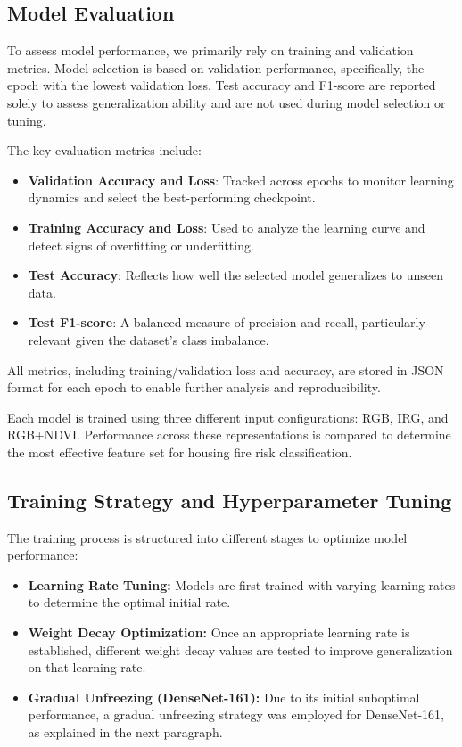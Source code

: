 \subsection{Model Evaluation}

To assess model performance, we primarily rely on training and validation metrics.
Model selection is based on validation performance, specifically, the epoch 
with the lowest validation loss. Test accuracy and F1-score are reported 
solely to assess generalization ability and are not used during model 
selection or tuning.

The key evaluation metrics include:

\begin{itemize}
    \item \textbf{Validation Accuracy and Loss}: Tracked across epochs to monitor learning dynamics and select the best-performing checkpoint.
    \item \textbf{Training Accuracy and Loss}: Used to analyze the learning curve and detect signs of overfitting or underfitting.
    \item \textbf{Test Accuracy}: Reflects how well the selected model generalizes to unseen data.
    \item \textbf{Test F1-score}: A balanced measure of precision and recall, particularly relevant given the dataset's class imbalance.
\end{itemize}

All metrics, including training/validation loss and accuracy, 
are stored in JSON format for each epoch to enable further analysis 
and reproducibility.


Each model is trained using three different input configurations: RGB, 
IRG, and RGB+NDVI. Performance across these representations is compared 
to determine the most effective feature set for housing fire risk classification.


\subsection{Training Strategy and Hyperparameter Tuning}

The training process is structured into different stages to optimize model performance:

\begin{itemize}
    \item \textbf{Learning Rate Tuning:} Models are first trained with varying learning rates to determine the optimal initial rate.
    \item \textbf{Weight Decay Optimization:} Once an appropriate learning rate is established, different weight decay values are tested to improve generalization on that learning rate.
    \item \textbf{Gradual Unfreezing (DenseNet-161):} Due to its initial suboptimal performance, a gradual unfreezing strategy was employed for DenseNet-161, as explained in the next paragraph.
\end{itemize}

